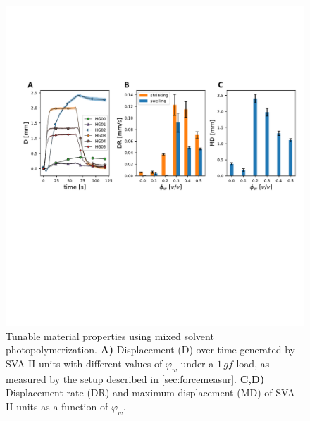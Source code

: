 \begin{figure}[!ht]
\centering
\includegraphics[width=\textwidth]{forcedisp.pdf}
\caption[]{Tunable material properties using mixed solvent photopolymerization.
\textbf{A)} Displacement (D) over time generated by SVA-II units with different values of \(\varphi_{w}\)  under a $1\,gf$ load, as measured by the setup described in \ref{sec:forcemeasur}. \textbf{C,D)} Displacement rate (DR) and maximum displacement (MD) of SVA-II units as a function of $\varphi_w$.}
\label{fig:forcedisp}
\end{figure}

